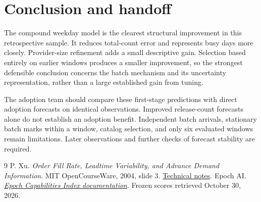 \documentclass[10pt]{article}
\begin{document}
\section*{Conclusion and handoff}
The compound weekday model is the clearest structural improvement in this retrospective sample. It reduces total-count error and represents busy days more closely. Provider-size refinement adds a small descriptive gain. Selection based entirely on earlier windows produces a smaller improvement, so the strongest defensible conclusion concerns the batch mechanism and its uncertainty representation, rather than a large established gain from tuning.

The adoption team should compare these first-stage predictions with direct adoption forecasts on identical observations. Improved release-count forecasts alone do not establish an adoption benefit. Independent batch arrivals, stationary batch marks within a window, catalog selection, and only six evaluated windows remain limitations. Later observations and further checks of forecast stability are required.

{\footnotesize
\begin{thebibliography}{9}
 P. Xu. \emph{Order Fill Rate, Leadtime Variability, and Advance Demand Information}. MIT OpenCourseWare, 2004, slide 3. \href{https://ocw.mit.edu/courses/15-764-the-theory-of-operations-management-spring-2004/7e65b5f67ebdb735f55d984413f56b84_lec7_xu.pdf}{Technical notes}.
 Epoch AI. \href{https://epoch.ai/data/eci-documentation/methodology}{\emph{Epoch Capabilities Index documentation}}. Frozen scores retrieved October 30, 2026.
\end{thebibliography}
}
\end{document}
